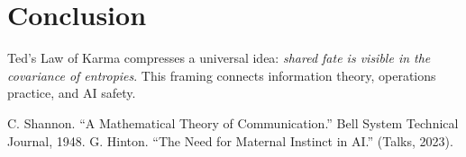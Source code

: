 \documentclass[11pt]{article}
\begin{document}
\section{Conclusion}
Ted's Law of Karma compresses a universal idea: 
\emph{shared fate is visible in the covariance of entropies}.
This framing connects information theory, operations practice, and AI safety.

\begin{thebibliography}{9}
 C. Shannon. ``A Mathematical Theory of Communication.'' Bell System Technical Journal, 1948.
 G. Hinton. ``The Need for Maternal Instinct in AI.'' (Talks, 2023).
\end{thebibliography}
\end{document}
